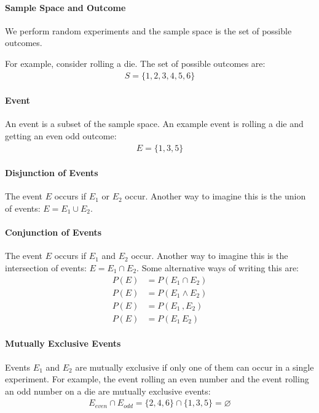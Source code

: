 

\paragraph{Sample Space and Outcome}
We perform random experiments and the sample space is the set of possible
outcomes.

For example, consider rolling a die. The set of possible outcomes are:
\begin{equation*} \begin{split}
	S = \{1,2,3,4,5,6\}
\end{split} \end{equation*}

\paragraph{Event} An event is a subset of the sample space. An example event is
rolling a die and getting an even odd outcome:
\begin{equation*} \begin{split}
	E = \{1,3,5\}
\end{split} \end{equation*}

\paragraph{Disjunction of Events} The event $E$ occurs if $E_1$ or $E_2$ occur.
Another way to imagine this is the union of events: $E = E_1 \cup E_2$.

\paragraph{Conjunction of Events} The event $E$ occurs if $E_1$ and $E_2$ occur.
Another way to imagine this is the intersection of events: $E = E_1 \cap E_2$.
Some alternative ways of writing this are:
\begin{equation*} \begin{split}
	P(E) &= P(E_1 \cap E_2) \\
	P(E) &= P(E_1 \wedge E_2) \\
	P(E) &= P(E_1\, ,  E_2) \\
	P(E) &= P(E_1\,  E_2) 
\end{split} \end{equation*}

\paragraph{Mutually Exclusive Events} Events $E_1$ and $E_2$ are mutually
exclusive if only one of them can occur in a single experiment. For example, the
event rolling an even number and the event rolling an odd number on a die are
mutually exclusive events:
\begin{equation*} \begin{split}
E_{even} \cap E_{odd} =  \{2,4,6\} \cap \{1,3,5\} = \varnothing
\end{split} \end{equation*}

